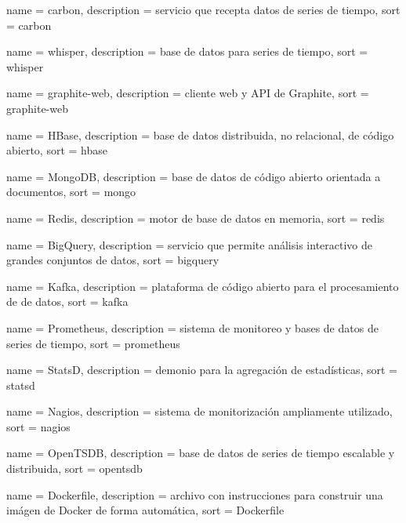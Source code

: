  {
  name        = {carbon},
  description = {servicio que recepta datos de series de tiempo},
  sort        = {carbon}
}

 {
  name        = {whisper},
  description = {base de datos para series de tiempo},
  sort        = {whisper}
}

 {
  name        = {graphite-web},
  description = {cliente web y API de Graphite},
  sort        = {graphite-web}
}

 {
  name        = {HBase},
  description = {base de datos distribuida, no relacional, de código abierto},
  sort        = {hbase}
}

 {
  name        = {MongoDB},
  description = {base de datos de código abierto orientada a documentos},
  sort        = {mongo}
}

 {
  name        = {Redis},
  description = {motor de base de datos en memoria},
  sort        = {redis}
}

 {
  name        = {BigQuery},
  description =
    {servicio  que permite análisis interactivo de grandes conjuntos
    de datos},
  sort        = {bigquery}
}

 {
  name        = {Kafka},
  description =
    {plataforma de código abierto para el procesamiento de  de
    datos},
  sort        = {kafka}
}

 {
  name        = {Prometheus},
  description = {sistema de monitoreo y bases de datos de series de tiempo},
  sort        = {prometheus}
}

 {
  name        = {StatsD},
  description = {demonio para la agregación de estadísticas},
  sort        = {statsd}
}

 {
  name        = {Nagios},
  description = {sistema de monitorización ampliamente utilizado},
  sort        = {nagios}
}

 {
  name        = {OpenTSDB},
  description = {base de datos de series de tiempo escalable y distribuida},
  sort        = {opentsdb}
}

 {
  name        = {Dockerfile},
  description = {archivo con instrucciones para construir una imágen de Docker de forma automática},
  sort        = {Dockerfile}
}

